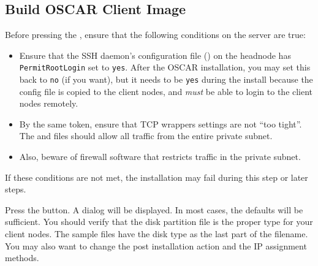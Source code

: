 

\subsection{Build OSCAR Client Image}
\label{det:build-client-image}

Before pressing the , ensure that the
following conditions on the server are true:

\begin{itemize}

\item Ensure that the SSH daemon's configuration file
  () on the headnode has {\tt PermitRootLogin}
  set to {\tt yes}.  After the OSCAR installation, you may set this back
  to {\tt no} (if you want), but it needs to be {\tt yes} during the install
  because the config file is copied to the client nodes, and 
  {\em must} be able to login to the client nodes remotely.

\item By the same token, ensure that TCP wrappers settings are not
  ``too tight''.  The  and 
  files should allow all traffic from the entire private subnet.

\item Also, beware of firewall software that restricts traffic in the
  private subnet.
\end{itemize}

If these conditions are not met, the installation may fail during this
step or later steps.

Press the  button. A dialog will be
displayed. In most cases, the defaults will be sufficient. You should
verify that the disk partition file is the proper type for your client
nodes. The sample files have the disk type as the last part of the
filename. You may also want to change the post installation action and
the IP assignment methods.  

